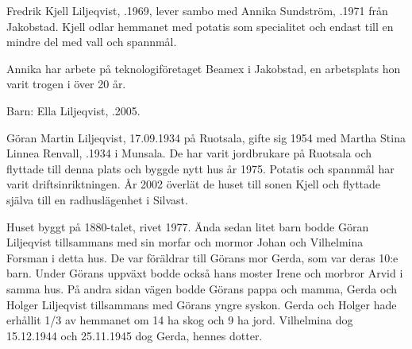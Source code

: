 Fredrik Kjell Liljeqvist, .1969, lever sambo med Annika Sundström, .1971 från Jakobstad.  Kjell odlar hemmanet med potatis som specialitet och endast till en mindre del med vall och spannmål.

Annika har arbete på teknologiföretaget Beamex i Jakobstad, en arbetsplats hon varit trogen i över 20 år.

Barn: Ella Liljeqvist, .2005.


Göran Martin Liljeqvist, 17.09.1934 på Ruotsala, gifte sig 1954 med Martha Stina Linnea Renvall, .1934 i Munsala. De har varit jordbrukare på Ruotsala och flyttade till denna plats och byggde nytt hus år 1975. Potatis och spannmål har varit driftsinriktningen. År 2002 överlät de huset till sonen Kjell och flyttade själva till en radhuslägenhet i Silvast.
\begin{jhchildren}
  \item {}
  \item {}
  \item {}
  \item {}
\end{jhchildren}





Huset byggt på 1880-talet, rivet 1977. Ända sedan litet barn bodde Göran Liljeqvist tillsammans med sin morfar och mormor Johan och Vilhelmina Forsman i detta hus. De var föräldrar till Görans mor Gerda, som var deras 10:e barn. Under Görans uppväxt bodde också hans moster Irene och morbror Arvid i samma hus. På andra sidan vägen bodde Görans pappa och mamma, Gerda och Holger Liljeqvist tillsammans med Görans yngre syskon. Gerda och Holger hade erhållit 1/3 av hemmanet om 14 ha skog och 9 ha jord. Vilhelmina dog 15.12.1944 och 25.11.1945 dog Gerda, hennes dotter.

